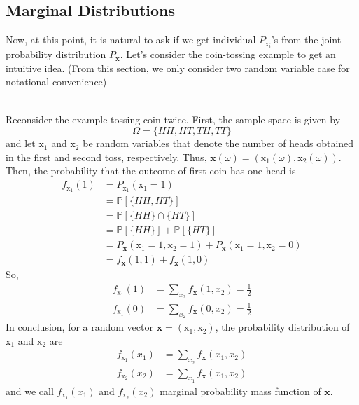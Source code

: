 \documentclass[twoside]{article}
\makeatletter
\theoremstyle{definition}
\theoremstyle{remark}
\theoremstyle{remark}
\newenvironment{example}
 {\patchcmd{\@thm}{\trivlist}{\list{}{\leftmargin=3em \rightmargin=3em}}{}{}%
  \vspace*{10\p@}
  \innerexample\pushQED{\hfill\ensuremath{\Diamond}}}
 {\popQED\endinnerexample}
\makeatother
\begin{document}
\subsection{Marginal Distributions}
Now, at this point, it is natural to ask if we get individual $P_{\mathrm{x}_i}$'s
from the joint probability distribution $P_\mathbf{x}$. Let's consider the coin-tossing
example to get an intuitive idea. (From this section, we only consider two random
variable case for notational convenience)

\begin{example}{\bf Tossing a coin 2 times} \\
  Reconsider the example tossing coin twice. First, the sample space is given by
  \begin{equation*}
    \Omega = {\{ HH, HT, TH, TT \}}
  \end{equation*}
  and let $\mathrm{x}_1$ and $\mathrm{x}_2$ be random variables that denote the
  number of heads obtained in the first and second toss, respectively. Thus,
  $\mathbf{x}(\omega) = (\mathrm{x}_1(\omega), \mathrm{x}_2(\omega))$. Then, the
  probability that the outcome of first coin has one head is
  \begin{equation*}
    \begin{split}
      f_{\mathrm{x}_1}(1)
      &= P_{\mathrm{x}_1}(\mathrm{x}_1 = 1) \\
      &= \mathbb{P}[\{HH, HT\}] \\
      &= \mathbb{P}[\{HH\} \cap \{HT\}] \\
      &= \mathbb{P}[\{HH\}] + \mathbb{P}[\{HT\}] \\
      &= P_{\mathbf{x}}(\mathrm{x}_1 = 1, \mathrm{x}_2 = 1)
       + P_{\mathbf{x}}(\mathrm{x}_1 = 1, \mathrm{x}_2 = 0) \\
      &= f_{\mathbf{x}}(1, 1)
       + f_{\mathbf{x}}(1, 0)
    \end{split}
  \end{equation*}
  So,
  \begin{equation*}
    \begin{split}
      f_{\mathrm{x}_1}(1) & = \sum_{x_2} f_{\mathbf{x}}(1, x_2) = \frac{1}{2} \\
      f_{\mathrm{x}_1}(0) & = \sum_{x_2} f_{\mathbf{x}}(0, x_2) = \frac{1}{2}
    \end{split}
  \end{equation*}
\end{example}
In conclusion, for a random vector $\mathbf{x} = (\mathrm{x}_1, \mathrm{x}_2)$,
the probability distribution of $\mathrm{x}_1$ and $\mathrm{x}_2$ are
\begin{equation}
  \begin{split}
    f_{\mathrm{x}_1}(x_1) & = \sum_{x_2} f_{\mathbf{x}}(x_1, x_2)\\
    f_{\mathrm{x}_2}(x_2) & = \sum_{x_1} f_{\mathbf{x}}(x_1, x_2)
  \end{split}
\end{equation}
and we call $f_{\mathrm{x}_1}(x_1)$ and $f_{\mathrm{x}_2}(x_2)$ marginal probability
mass function of $\mathbf{x}$.\\[0.5\baselineskip]
\end{document}
